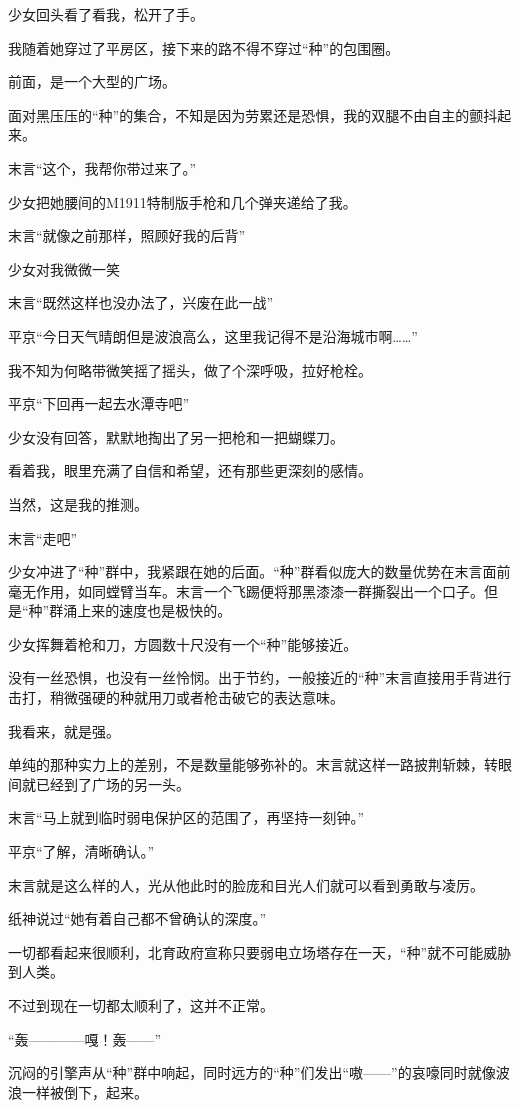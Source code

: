 少女回头看了看我，松开了手。

我随着她穿过了平房区，接下来的路不得不穿过“种”的包围圈。

前面，是一个大型的广场。

面对黑压压的“种”的集合，不知是因为劳累还是恐惧，我的双腿不由自主的颤抖起来。

末言“这个，我帮你带过来了。”

少女把她腰间的M1911特制版手枪和几个弹夹递给了我。

末言“就像之前那样，照顾好我的后背”

少女对我微微一笑

末言“既然这样也没办法了，兴废在此一战”

平京“今日天气晴朗但是波浪高么，这里我记得不是沿海城市啊……”

我不知为何略带微笑摇了摇头，做了个深呼吸，拉好枪栓。

平京“下回再一起去水潭寺吧”

少女没有回答，默默地掏出了另一把枪和一把蝴蝶刀。

看着我，眼里充满了自信和希望，还有那些更深刻的感情。

当然，这是我的推测。

末言“走吧”

少女冲进了“种”群中，我紧跟在她的后面。“种”群看似庞大的数量优势在末言面前毫无作用，如同螳臂当车。末言一个飞踢便将那黑漆漆一群撕裂出一个口子。但是“种”群涌上来的速度也是极快的。

少女挥舞着枪和刀，方圆数十尺没有一个“种”能够接近。

没有一丝恐惧，也没有一丝怜悯。出于节约，一般接近的“种”末言直接用手背进行击打，稍微强硬的种就用刀或者枪击破它的表达意味。

我看来，就是强。

单纯的那种实力上的差别，不是数量能够弥补的。末言就这样一路披荆斩棘，转眼间就已经到了广场的另一头。

末言“马上就到临时弱电保护区的范围了，再坚持一刻钟。”

平京“了解，清晰确认。”

末言就是这么样的人，光从他此时的脸庞和目光人们就可以看到勇敢与凌厉。

纸神说过“她有着自己都不曾确认的深度。”

一切都看起来很顺利，北育政府宣称只要弱电立场塔存在一天，“种”就不可能威胁到人类。

不过到现在一切都太顺利了，这并不正常。

“轰————嘎！轰——”

沉闷的引擎声从“种”群中响起，同时远方的“种”们发出“嗷——”的哀嚎同时就像波浪一样被倒下，起来。

